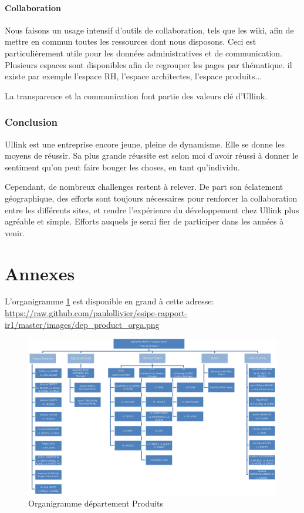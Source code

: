 \documentclass[a4paper, 12pt]{article}
\begin{document}
\subsection{Collaboration}

Nous faisons un usage intensif d'outils de collaboration, tels que les wiki, afin de mettre en commun toutes les ressources dont nous disposons. Ceci est particulièrement utile pour les données administratives et de communication. Plusieurs espaces sont disponibles afin de regrouper les pages par thématique. il existe par exemple l'espace RH, l'espace architectes, l'espace produits...

La transparence et la communication font partie des valeurs clé d'Ullink.

\pagebreak
\section*{Conclusion}

Ullink est une entreprise encore jeune, pleine de dynamisme. Elle se donne les moyens de réussir. Sa plus grande réussite est selon moi d'avoir réussi à donner le sentiment qu'on peut faire bouger les choses, en tant qu'individu.

Cependant, de nombreux challenges restent à relever. De part son éclatement géographique, des efforts sont toujours nécessaires pour renforcer la collaboration entre les différents sites, et rendre l'expérience du développement chez Ullink plus agréable et simple. Efforts auquels je serai fier de participer dans les années à venir.

\pagebreak

\part*{Annexes}
L'organigramme \ref{Product_dpts_orga} est disponible en grand à cette adresse: \url{https://raw.github.com/paulollivier/esipe-rapport-ir1/master/images/dep_product_orga.png}
\begin{figure}
\includegraphics[width=525pt, angle=90]{dep_product_orga.png}
\caption{Organigramme département Produits}
\label{Product_dpts_orga}
\end{figure}
\end{document}
